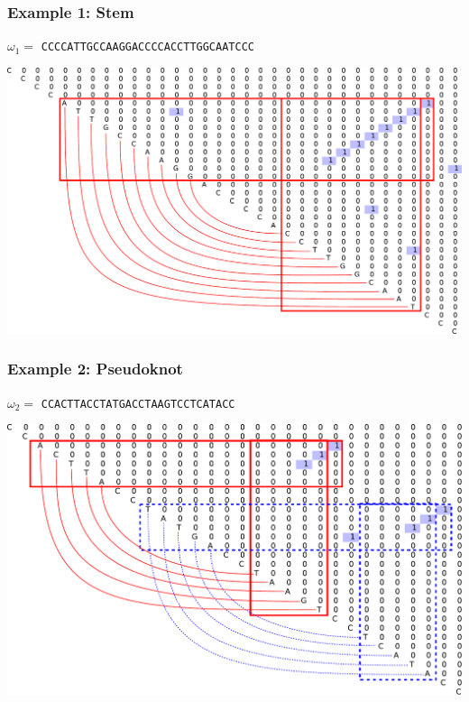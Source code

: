 \documentclass[xcolor=table]{beamer}
\begin{document}
\begin{frame}[fragile] \frametitle{Example 1: Stem}
\centering
 $\omega_1=$ \texttt{CCCCATTGCCAAGGACCCCACCTTGGCAATCCC}
\vspace{1cm}

\includegraphics[width=.8\textwidth]{pictures/4.pdf}

\end{frame}

\begin{frame}[fragile] \frametitle{Example 2: Pseudoknot}
\centering
 $\omega_2=$ \texttt{CCACTTACCTATGACCTAAGTCCTCATACC}
\vspace{1cm}

\includegraphics[width=.8\textwidth]{pictures/5.pdf}

\end{frame}
\end{document}
